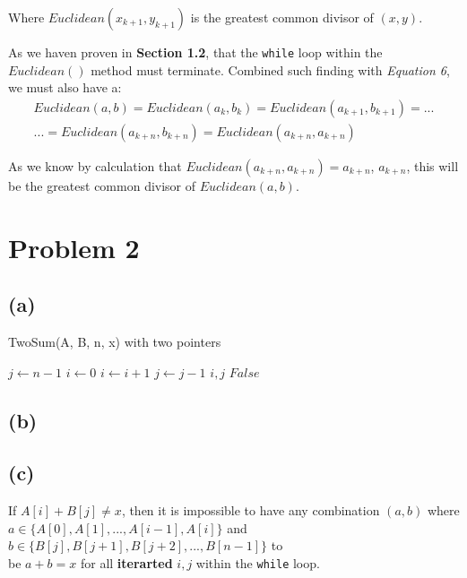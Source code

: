 \documentclass[12pt]{article}
\newcommand{\inlinecode}{\texttt}
\begin{document}
Where $Euclidean(x_{k+1}, y_{k+1})$ is the greatest common divisor of $(x, y)$.\newline


As we haven proven in \textbf{Section 1.2}, that the \inlinecode{while} loop within the $Euclidean()$ method must terminate. Combined such finding with \textit{Equation 6}, we must also have a:
\begin{gather}
    Euclidean(a, b) = Euclidean(a_{k}, b_{k}) = Euclidean(a_{k+1}, b_{k+1}) = ... \\ ... = Euclidean(a_{k+n}, b_{k+n}) = Euclidean(a_{k+n}, a_{k+n}) \nonumber
\end{gather}

As we know by calculation that $Euclidean(a_{k+n}, a_{k+n}) = a_{k+n}$, $a_{k+n}$, this will be the greatest common divisor of $Euclidean(a, b)$.

\section{Problem 2}
\subsection{(a)}

\begin{algorithm}
\caption{TwoSum(A, B, n, x) with two pointers}\label{TwoSum}
\begin{algorithmic}[1]
\Procedure{}{}
\State $j \gets n-1$
\State $i \gets 0$
        \State $i \gets i + 1$
        \State $j \gets j - 1$
    \Else
        \State \Return $i, j$
    \EndIf
\EndWhile
\State \Return $False$
\EndProcedure
\end{algorithmic}
\end{algorithm}



\subsection{(b)}
\subsection{(c)}
If $A[i] + B[j] \neq x$, then it is impossible to have any combination $(a, b)$ where \\ $a \in \{A[0], A[1], ..., A[i-1], A[i]\}$ and $b \in \{B[j], B[j+1], B[j+2], ..., B[n-1]\}$ to \\be $a + b = x$ for all \textbf{iterarted} $i, j$ within the \inlinecode{while} loop.
\end{document}
